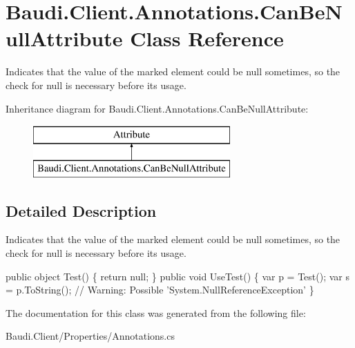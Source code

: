 \hypertarget{class_baudi_1_1_client_1_1_annotations_1_1_can_be_null_attribute}{}\section{Baudi.\+Client.\+Annotations.\+Can\+Be\+Null\+Attribute Class Reference}
\label{class_baudi_1_1_client_1_1_annotations_1_1_can_be_null_attribute}


Indicates that the value of the marked element could be {\ttfamily null} sometimes, so the check for {\ttfamily null} is necessary before its usage.  


Inheritance diagram for Baudi.\+Client.\+Annotations.\+Can\+Be\+Null\+Attribute\+:\begin{figure}[H]
\begin{center}
\leavevmode
\includegraphics[height=2.000000cm]{class_baudi_1_1_client_1_1_annotations_1_1_can_be_null_attribute}
\end{center}
\end{figure}


\subsection{Detailed Description}
Indicates that the value of the marked element could be {\ttfamily null} sometimes, so the check for {\ttfamily null} is necessary before its usage. 


\begin{DoxyCode}
[CanBeNull] \textcolor{keyword}{public} \textcolor{keywordtype}{object} Test() \{ \textcolor{keywordflow}{return} null; \}
\textcolor{keyword}{public} \textcolor{keywordtype}{void} UseTest() \{
  var p = Test();
  var s = p.ToString(); \textcolor{comment}{// Warning: Possible 'System.NullReferenceException'}
\}
\end{DoxyCode}


The documentation for this class was generated from the following file\+:\begin{DoxyCompactItemize}
\item 
Baudi.\+Client/\+Properties/Annotations.\+cs\end{DoxyCompactItemize}
